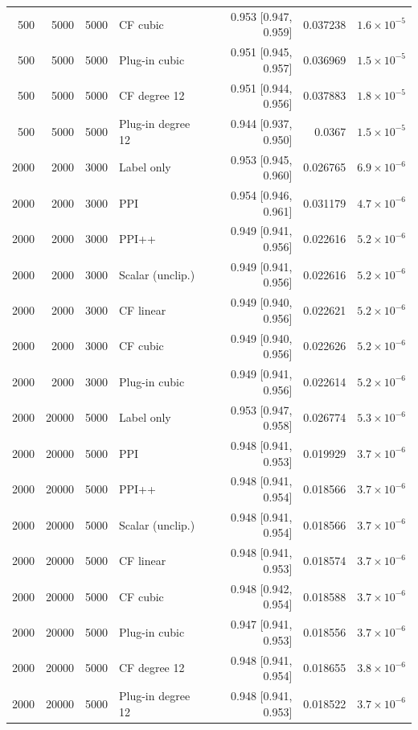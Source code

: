 {\begin{longtable}{rrrlrrr}
500 & 5000 & 5000 & CF cubic & 0.953 [0.947, 0.959] & 0.037238 & $1.6\times 10^{-5}$ \\
500 & 5000 & 5000 & Plug-in cubic & 0.951 [0.945, 0.957] & 0.036969 & $1.5\times 10^{-5}$ \\
500 & 5000 & 5000 & CF degree 12 & 0.951 [0.944, 0.956] & 0.037883 & $1.8\times 10^{-5}$ \\
500 & 5000 & 5000 & Plug-in degree 12 & 0.944 [0.937, 0.950] & 0.0367 & $1.5\times 10^{-5}$ \\
2000 & 2000 & 3000 & Label only & 0.953 [0.945, 0.960] & 0.026765 & $6.9\times 10^{-6}$ \\
2000 & 2000 & 3000 & PPI & 0.954 [0.946, 0.961] & 0.031179 & $4.7\times 10^{-6}$ \\
2000 & 2000 & 3000 & PPI++ & 0.949 [0.941, 0.956] & 0.022616 & $5.2\times 10^{-6}$ \\
2000 & 2000 & 3000 & Scalar (unclip.) & 0.949 [0.941, 0.956] & 0.022616 & $5.2\times 10^{-6}$ \\
2000 & 2000 & 3000 & CF linear & 0.949 [0.940, 0.956] & 0.022621 & $5.2\times 10^{-6}$ \\
2000 & 2000 & 3000 & CF cubic & 0.949 [0.940, 0.956] & 0.022626 & $5.2\times 10^{-6}$ \\
2000 & 2000 & 3000 & Plug-in cubic & 0.949 [0.941, 0.956] & 0.022614 & $5.2\times 10^{-6}$ \\
2000 & 20000 & 5000 & Label only & 0.953 [0.947, 0.958] & 0.026774 & $5.3\times 10^{-6}$ \\
2000 & 20000 & 5000 & PPI & 0.948 [0.941, 0.953] & 0.019929 & $3.7\times 10^{-6}$ \\
2000 & 20000 & 5000 & PPI++ & 0.948 [0.941, 0.954] & 0.018566 & $3.7\times 10^{-6}$ \\
2000 & 20000 & 5000 & Scalar (unclip.) & 0.948 [0.941, 0.954] & 0.018566 & $3.7\times 10^{-6}$ \\
2000 & 20000 & 5000 & CF linear & 0.948 [0.941, 0.953] & 0.018574 & $3.7\times 10^{-6}$ \\
2000 & 20000 & 5000 & CF cubic & 0.948 [0.942, 0.954] & 0.018588 & $3.7\times 10^{-6}$ \\
2000 & 20000 & 5000 & Plug-in cubic & 0.947 [0.941, 0.953] & 0.018556 & $3.7\times 10^{-6}$ \\
2000 & 20000 & 5000 & CF degree 12 & 0.948 [0.941, 0.954] & 0.018655 & $3.8\times 10^{-6}$ \\
2000 & 20000 & 5000 & Plug-in degree 12 & 0.948 [0.941, 0.953] & 0.018522 & $3.7\times 10^{-6}$ \\
\end{longtable}}
